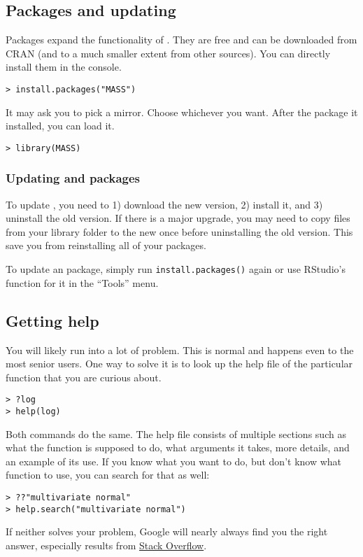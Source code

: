 \subsection{Packages and updating}

Packages expand the functionality of \R. They are free and can be downloaded from CRAN (and to a much smaller extent from other sources). You can directly install them in the console. 

\begin{lstlisting}
> install.packages("MASS")
\end{lstlisting}

It may ask you to pick a mirror. Choose whichever you want. After the package it installed, you can load it.

\begin{lstlisting}
> library(MASS)
\end{lstlisting}

\subsubsection*{Updating \R and \R packages}

To update \R, you need to 1) download the new version, 2) install it, and 3) uninstall the old version. If there is a major upgrade, you may need to copy files from your library folder to the new once before uninstalling the old version. This save you from reinstalling all of your packages.

To update an \R package, simply run \verb|install.packages()| again or use RStudio's function for it in the ``Tools'' menu.

\subsection{Getting help}

You will likely run into a lot of problem. This is normal and happens even to the most senior \R users. One way to solve it is to look up the \R help file of the particular function that you are curious about.

\begin{lstlisting}
> ?log
> help(log)
\end{lstlisting}

Both commands do the same. The help file consists of multiple sections such as what the function is supposed to do, what arguments it takes, more details, and an example of its use. If you know what you want to do, but don't know what function to use, you can search for that as well:

\begin{lstlisting}
> ??"multivariate normal"
> help.search("multivariate normal")
\end{lstlisting}

If neither solves your problem, Google will nearly always find you the right answer, especially results from \href{htpp://www.stackoverflow.com}{Stack Overflow}.




